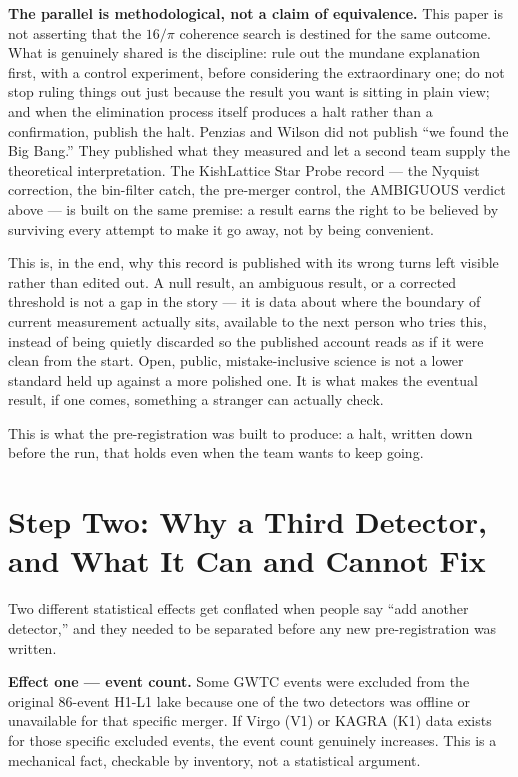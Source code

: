 \documentclass[11pt, letterpaper, openany]{book}
\begin{document}
\begin{warningbox}
\textbf{The parallel is methodological, not a claim of equivalence.}
This paper is not asserting that the $16/\pi$ coherence search is
destined for the same outcome. What is genuinely shared is the
discipline: rule out the mundane explanation first, with a control
experiment, before considering the extraordinary one; do not stop
ruling things out just because the result you want is sitting in plain
view; and when the elimination process itself produces a halt rather
than a confirmation, publish the halt. Penzias and Wilson did not
publish ``we found the Big Bang.'' They published what they measured
and let a second team supply the theoretical interpretation. The
KishLattice Star Probe record --- the Nyquist correction, the bin-filter
catch, the pre-merger control, the AMBIGUOUS verdict above --- is built
on the same premise: a result earns the right to be believed by
surviving every attempt to make it go away, not by being convenient.
\end{warningbox}
 
This is, in the end, why this record is published with its wrong turns
left visible rather than edited out. A null result, an ambiguous result,
or a corrected threshold is not a gap in the story --- it is data about
where the boundary of current measurement actually sits, available to
the next person who tries this, instead of being quietly discarded so
the published account reads as if it were clean from the start. Open,
public, mistake-inclusive science is not a lower standard held up
against a more polished one. It is what makes the eventual result, if
one comes, something a stranger can actually check.
 
This is what the pre-registration was built to produce: a halt, written
down before the run, that holds even when the team wants to keep going.

\clearpage
\section{Step Two: Why a Third Detector, and What It Can and Cannot Fix}

Two different statistical effects get conflated when people say ``add
another detector,'' and they needed to be separated before any new
pre-registration was written.

\textbf{Effect one --- event count.} Some GWTC events were excluded from
the original 86-event H1-L1 lake because one of the two detectors was
offline or unavailable for that specific merger. If Virgo (V1) or KAGRA
(K1) data exists for those specific excluded events, the event count
genuinely increases. This is a mechanical fact, checkable by inventory,
not a statistical argument.
\end{document}

